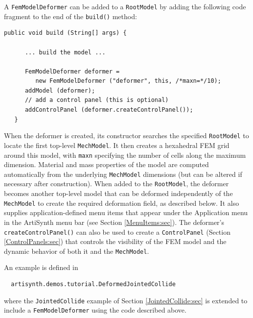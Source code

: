 A {\tt FemModelDeformer} can be added to a {\tt RootModel} by adding
the following code fragment to the end of the {\tt build()} method:
%
\begin{lstlisting}[]
   public void build (String[] args) {

      ... build the model ...

      FemModelDeformer deformer =
         new FemModelDeformer ("deformer", this, /*maxn=*/10);
      addModel (deformer);
      // add a control panel (this is optional)
      addControlPanel (deformer.createControlPanel());  
   }
\end{lstlisting}
%
When the deformer is created, its constructor searches the specified
{\tt RootModel} to locate the first top-level {\tt MechModel}. It then
creates a hexahedral FEM grid around this model, with {\tt maxn} specifying
the number of cells along the maximum dimension. Material and
mass properties of the model are computed automatically from the
underlying {\tt MechModel} dimensions (but can be altered if necessary after
construction). When added to the {\tt RootModel},
the deformer becomes another top-level model that can be deformed
independently of the {\tt MechModel} to create the required
deformation field, as described below. It also supplies application-defined
menu items that appear under the {\sf Application} menu in the ArtiSynth
menu bar (see Section \ref{MenuItems:sec}). 
The deformer's {\tt createControlPanel()} can also be used
to create a {\tt ControlPanel} (Section \ref{ControlPanels:sec}) that
controls the visibility of the FEM model and the dynamic behavior of
both it and the {\tt MechModel}.

An example is defined in 
%
\begin{verbatim}
  artisynth.demos.tutorial.DeformedJointedCollide
\end{verbatim}
%
where the {\tt JointedCollide} example of Section
\ref{JointedCollide:sec} is extended to include a 
{\tt FemModelDeformer} using the code described above.

